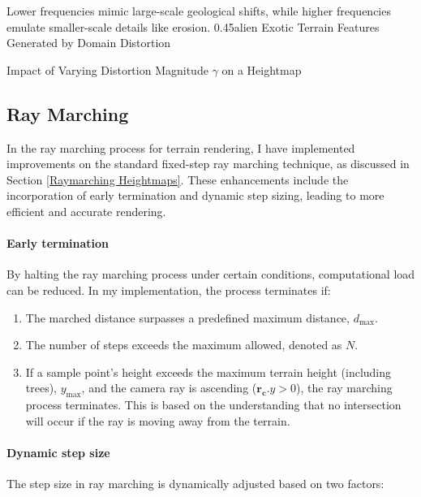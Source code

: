{Lower frequencies mimic large-scale geological shifts, while higher frequencies emulate smaller-scale details like erosion.}
{0.45}{alien}
{Exotic Terrain Features Generated by Domain Distortion}

{Impact of Varying Distortion Magnitude $\gamma$ on a Heightmap}


\subsection{Ray Marching}
\label{Terrain Raymarching}

In the ray marching process for terrain rendering, I have implemented improvements on the standard fixed-step ray marching technique, as discussed in Section \ref{Raymarching Heightmaps}. These enhancements include the incorporation of early termination and dynamic step sizing, leading to more efficient and accurate rendering.

\paragraph{Early termination}

By halting the ray marching process under certain conditions, computational load can be reduced. In my implementation, the process terminates if:

\begin{enumerate}
    \item The marched distance surpasses a predefined maximum distance, $d_{\text{max}}$.
    \item The number of steps exceeds the maximum allowed, denoted as $N$.
    \item If a sample point's height exceeds the maximum terrain height (including trees), $y_{\text{max}}$, and the camera ray is ascending ($\mathbf{r_c}.y > 0$), the ray marching process terminates. This is based on the understanding that no intersection will occur if the ray is moving away from the terrain.
\end{enumerate}

\paragraph{Dynamic step size}

The step size in ray marching is dynamically adjusted based on two factors:

